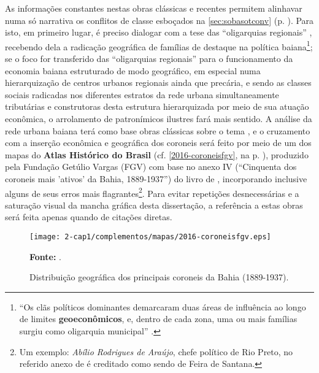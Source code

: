 As informações constantes nestas obras clássicas e recentes permitem alinhavar numa só narrativa os conflitos de classe esboçados na \autoref{sec:sobasotconv} (p. \pageref{sec:sobasotconv}). Para isto, em primeiro lugar, é preciso dialogar com a tese das ``oligarquias regionais'' \cite{pang_coronelismo_1979,sampaio_partidos_1978,TAVARES2008}, recebendo dela a radicação geográfica de famílias de destaque na política baiana\footnote{``Os clãs políticos dominantes demarcaram duas áreas de influência ao longo de limites \textbf{geoeconômicos}, e, dentro de cada zona, uma ou mais famílias surgiu como oligarquia municipal'' \cite[p.~76, \textbf{grifo nosso}]{pang_coronelismo_1979}.}; se o foco for transferido das ``oligarquias regionais'' para o funcionamento da economia baiana estruturado de modo geográfico, em especial numa hierarquização de centros urbanos regionais ainda que precária, e sendo as classes sociais radicadas nos diferentes estratos da rede urbana simultaneamente tributárias e construtoras desta estrutura hierarquizada por meio de sua atuação econômica, o arrolamento de patronímicos ilustres fará mais sentido. A análise da rede urbana baiana terá como base obras clássicas sobre o tema \cite{geiger_rede_1963,SANTOS1959}, e o cruzamento com a inserção econômica e geográfica dos coroneis será feito por meio de um dos mapas do \textbf{Atlas Histórico do Brasil} (cf. \autoref{2016-coroneisfgv}, na p. \pageref{2016-coroneisfgv}), produzido pela Fundação Getúlio Vargas (FGV) \cite{fgv_coroneis_2016} com base no anexo IV (``Cinquenta dos coroneis mais 'ativos' da Bahia, 1889-1937'') do livro de , incorporando inclusive alguns de seus erros mais flagrantes\footnote{Um exemplo: \textit{Abílio Rodrigues de Araújo}, chefe político de Rio Preto, no referido anexo de  é creditado como sendo de Feira de Santana.}. Para evitar repetições desnecessárias e a saturação visual da mancha gráfica desta dissertação, a referência a estas obras será feita apenas quando de citações diretas.

\begin{figure}[!htp]
\centering
\texttt{[image: 2-cap1/complementos/mapas/2016-coroneisfgv.eps]}{\footnotesize \par \textbf{Fonte:} .}
\caption{Distribuição geográfica dos principais coroneis da Bahia (1889-1937).}\label{2016-coroneisfgv}
\end{figure}

